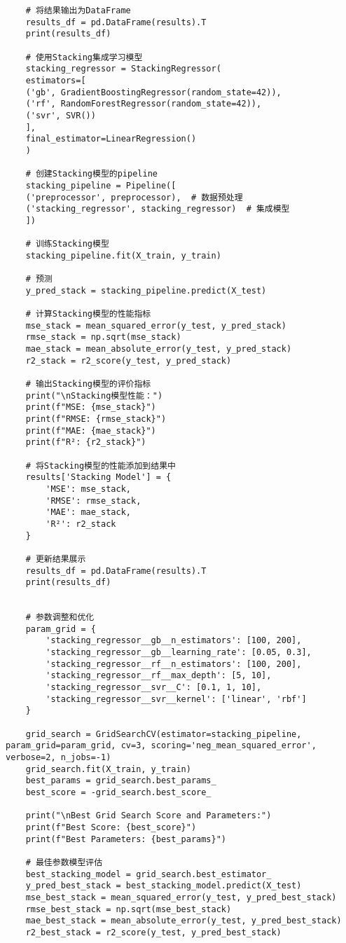 \documentclass[bwprint,fontset=windows]{gmcmthesis}
\begin{document}
\begin{lstlisting}
	# 将结果输出为DataFrame
	results_df = pd.DataFrame(results).T
	print(results_df)
	
	# 使用Stacking集成学习模型
	stacking_regressor = StackingRegressor(
	estimators=[
	('gb', GradientBoostingRegressor(random_state=42)),
	('rf', RandomForestRegressor(random_state=42)),
	('svr', SVR())
	],
	final_estimator=LinearRegression()
	)
	
	# 创建Stacking模型的pipeline
	stacking_pipeline = Pipeline([
	('preprocessor', preprocessor),  # 数据预处理
	('stacking_regressor', stacking_regressor)  # 集成模型
	])
	
	# 训练Stacking模型
	stacking_pipeline.fit(X_train, y_train)
	
	# 预测
	y_pred_stack = stacking_pipeline.predict(X_test)
	
	# 计算Stacking模型的性能指标
	mse_stack = mean_squared_error(y_test, y_pred_stack)
	rmse_stack = np.sqrt(mse_stack)
	mae_stack = mean_absolute_error(y_test, y_pred_stack)
	r2_stack = r2_score(y_test, y_pred_stack)
	
	# 输出Stacking模型的评价指标
	print("\nStacking模型性能：")
	print(f"MSE: {mse_stack}")
	print(f"RMSE: {rmse_stack}")
	print(f"MAE: {mae_stack}")
	print(f"R²: {r2_stack}")
	
	# 将Stacking模型的性能添加到结果中
	results['Stacking Model'] = {
		'MSE': mse_stack,
		'RMSE': rmse_stack,
		'MAE': mae_stack,
		'R²': r2_stack
	}
	
	# 更新结果展示
	results_df = pd.DataFrame(results).T
	print(results_df)
	
	
	# 参数调整和优化
	param_grid = {
		'stacking_regressor__gb__n_estimators': [100, 200],
		'stacking_regressor__gb__learning_rate': [0.05, 0.3],
		'stacking_regressor__rf__n_estimators': [100, 200],
		'stacking_regressor__rf__max_depth': [5, 10],
		'stacking_regressor__svr__C': [0.1, 1, 10],
		'stacking_regressor__svr__kernel': ['linear', 'rbf']
	}
	
	grid_search = GridSearchCV(estimator=stacking_pipeline, param_grid=param_grid, cv=3, scoring='neg_mean_squared_error', verbose=2, n_jobs=-1)
	grid_search.fit(X_train, y_train)
	best_params = grid_search.best_params_
	best_score = -grid_search.best_score_
	
	print("\nBest Grid Search Score and Parameters:")
	print(f"Best Score: {best_score}")
	print(f"Best Parameters: {best_params}")
	
	# 最佳参数模型评估
	best_stacking_model = grid_search.best_estimator_
	y_pred_best_stack = best_stacking_model.predict(X_test)
	mse_best_stack = mean_squared_error(y_test, y_pred_best_stack)
	rmse_best_stack = np.sqrt(mse_best_stack)
	mae_best_stack = mean_absolute_error(y_test, y_pred_best_stack)
	r2_best_stack = r2_score(y_test, y_pred_best_stack)
	

\end{lstlisting}
\end{document}
